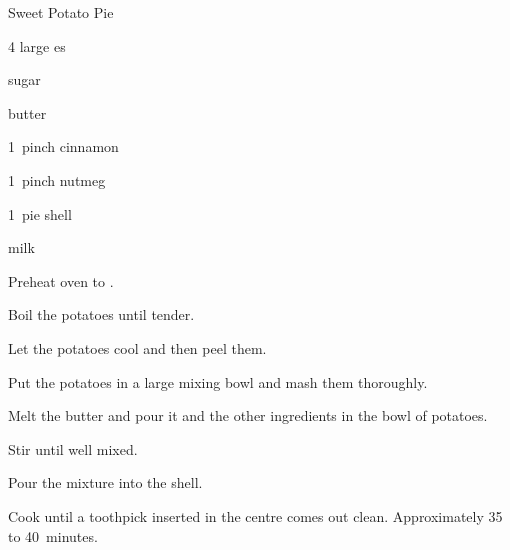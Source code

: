 \begin{recipe}{Sweet Potato Pie}{}{}

\begin{ingredients}
\item 4 large es
\item {} sugar
\item \C{\half} butter
\item 1~pinch cinnamon
\item 1~pinch nutmeg
\item 1~pie shell
\item \C{\half} milk
\end{ingredients}

\begin{directions}
\item Preheat oven to .
\item Boil the potatoes until tender.
\item Let the potatoes cool and then peel them.
\item Put the potatoes in a large mixing bowl and mash them thoroughly.
\item Melt the butter and pour it and the other ingredients in the bowl of potatoes.
\item Stir until well mixed. 
\item Pour the mixture into the shell.
\item Cook until a toothpick inserted in the centre comes out clean. Approximately 35 to 40~minutes.
\end{directions}

\end{recipe}
